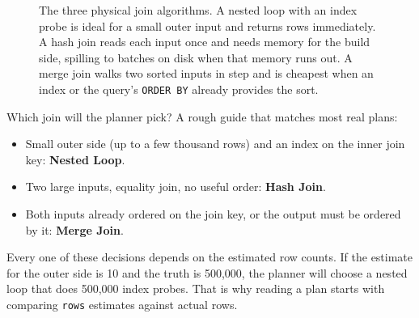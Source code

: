 \begin{figure}[H]
\caption{The three physical join algorithms. A nested loop with an index probe is ideal for a small outer input and returns rows immediately. A hash join reads each input once and needs memory for the build side, spilling to batches on disk when that memory runs out. A merge join walks two sorted inputs in step and is cheapest when an index or the query's \texttt{ORDER BY} already provides the sort.}
\label{ch07:fig-joins}
\end{figure}

\begin{focusbox}
Which join will the planner pick? A rough guide that matches most real plans:
\begin{itemize}
  \item Small outer side (up to a few thousand rows) and an index on the inner join key: \textbf{Nested Loop}.
  \item Two large inputs, equality join, no useful order: \textbf{Hash Join}.
  \item Both inputs already ordered on the join key, or the output must be ordered by it: \textbf{Merge Join}.
\end{itemize}
Every one of these decisions depends on the estimated row counts. If the estimate for the outer side is 10 and the truth is 500,000, the planner will choose a nested loop that does 500,000 index probes. That is why reading a plan starts with comparing \texttt{rows} estimates against actual rows.
\end{focusbox}

